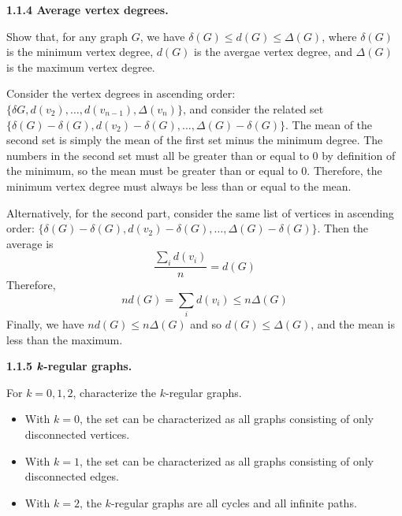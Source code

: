 \documentclass{article}
\begin{document}
\bigskip\par\textbf{1.1.4 Average vertex degrees.}
\par\smallskip
Show that, for any graph $G$, we have $\delta(G) \leq d(G) \leq \Delta(G)$, where $\delta(G)$ is the minimum vertex degree, $d(G)$ is the avergae vertex degree, and $\Delta(G)$ is the maximum vertex degree.
\par\smallskip
Consider the vertex degrees in ascending order: $\{\delta G, d(v_2), \ldots , d(v_{n-1}), \Delta (v_n)\}$, and consider the related set $\{\delta (G) - \delta (G), d(v_2) - \delta (G), \ldots , \Delta (G) - \delta (G)\}$. The mean of the second set is simply the mean of the first set minus the minimum degree. The numbers in the second set must all be greater than or equal to 0 by definition of the minimum, so the mean must be greater than or equal to 0. Therefore, the minimum vertex degree must always be less than or equal to the mean. 
\par Alternatively, for the second part, consider the same list of vertices in ascending order: $\{\delta (G) - \delta (G), d(v_2) - \delta (G), \ldots , \Delta (G) - \delta (G)\}$. Then the average is $$\frac{\sum_i d(v_i)}{n} = d(G)$$ Therefore, $$nd(G)=\sum_i d(v_i) \leq n\Delta(G)$$ Finally, we have $nd(G)\leq n\Delta(G)$ and so $d(G) \leq \Delta(G)$, and the mean is less than the maximum.
 
\bigskip\par\textbf{1.1.5 $\textit{\textbf{k}}$-regular graphs.}
\par\smallskip
For $k = 0, 1, 2$, characterize the $k$-regular graphs. 
\begin{itemize}
\item With $k =0$, the set can be characterized as all graphs consisting of only disconnected vertices.
\item With $k=1$, the set can be characterized as all graphs consisting of only disconnected edges.
\item With $k=2$, the $k$-regular graphs are all cycles and all infinite paths.
\end{itemize}
\end{document}
